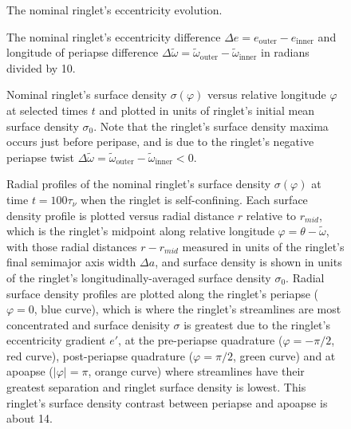 \documentclass[preprint]{aastex62}
\begin{document}
\begin{figure}
\caption{
\label{fig:e_nominal}
The nominal ringlet's eccentricity evolution.}
\end{figure}

\begin{figure}
    \caption{
        \label{fig:de_nominal}
        The nominal ringlet's eccentricity difference $\Delta e = e_{\text{outer}} - e_{\text{inner}}$
        and longitude of periapse difference
        $\Delta\tilde{\omega} = \tilde{\omega}_{\text{outer}} - \tilde{\omega}_{\text{inner}}$
        in radians divided by 10.
    }
\end{figure}

\begin{figure}
    \caption{
        \label{fig:nominal_sigma_vs_longitude}
        Nominal ringlet's surface density $\sigma(\varphi)$ versus relative
        longitude $\varphi$ at selected times $t$ and plotted in units of ringlet's initial
        mean surface density $\sigma_0$. Note that the ringlet's surface
        density maxima occurs just before peripase,  and is due to the ringlet's
        negative periapse twist 
        $\Delta\tilde{\omega} = \tilde{\omega}_{\text{outer}} - \tilde{\omega}_{\text{inner}} < 0$.
    }
\end{figure}

\begin{figure}
    \caption{
        \label{fig:radial_sigma_nominal}
        Radial profiles of the nominal ringlet's surface density $\sigma(\varphi)$ at time $t=100\tau_\nu$
        when the ringlet is self-confining. Each surface density profile is plotted versus radial distance $r$ 
        relative to $r_{mid}$, which is the ringlet's midpoint along relative longitude $\varphi = \theta-\tilde{\omega}$,
        with those radial distances $r - r_{mid}$ measured in units of the ringlet's final semimajor axis width $\Delta a$,
        and surface density is shown in units of the ringlet's longitudinally-averaged surface density $\sigma_0$.
        Radial surface density profiles are plotted along the ringlet's periapse ($\varphi=0$, blue curve), which is 
        where the ringlet's streamlines are most concentrated and surface denisity $\sigma$ is
        greatest due to the ringlet's eccentricity gradient $e'$, at the pre-periapse
        quadrature ($\varphi=-\pi/2$, red curve), post-periapse
        quadrature ($\varphi=\pi/2$, green curve)
        and at apoapse ($|\varphi|=\pi$, orange curve) where streamlines have their greatest separation
        and ringlet surface density is lowest. This ringlet's surface density contrast between periapse and
        apoapse is about 14.
    }
\end{figure}
\end{document}
